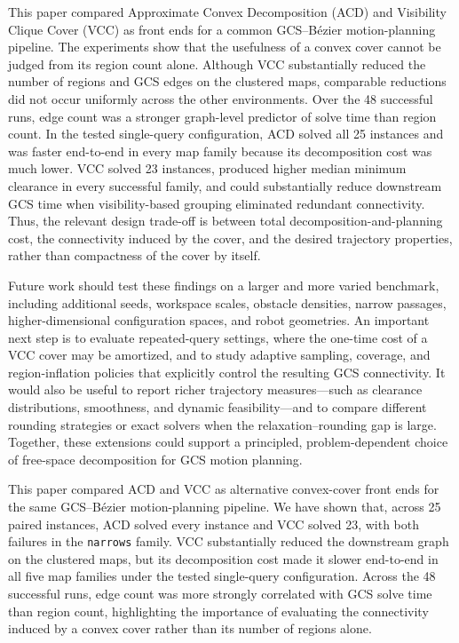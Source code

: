 ﻿\documentclass[runningheads]{llncs}
\newcommand{\code}[1]{\texttt{#1}}
\begin{document}
This paper compared Approximate Convex Decomposition (ACD) and Visibility
Clique Cover (VCC) as front ends for a common GCS--B\'ezier motion-planning
pipeline.  The experiments show that the usefulness of a convex cover cannot
be judged from its region count alone.  Although VCC substantially reduced the
number of regions and GCS edges on the {clustered} maps, comparable
reductions did not occur uniformly across the other environments.  Over the 48
successful runs, edge count was a stronger graph-level predictor of solve time
than region count.  In the tested single-query configuration, ACD solved all
25 instances and was faster end-to-end in every map family because its
decomposition cost was much lower.  VCC solved 23 instances, produced higher
median minimum clearance in every successful family, and could substantially
reduce downstream GCS time when visibility-based grouping eliminated redundant
connectivity.  Thus, the relevant design trade-off is between total
decomposition-and-planning cost, the connectivity induced by the cover, and
the desired trajectory properties, rather than compactness of the cover by
itself.

Future work should test these findings on a larger and more varied benchmark,
including additional seeds, workspace scales, obstacle densities, narrow
passages, higher-dimensional configuration spaces, and robot geometries.
An important next step is to evaluate repeated-query settings, where the
one-time cost of a VCC cover may be amortized, and to study adaptive sampling,
coverage, and region-inflation policies that explicitly control the resulting
GCS connectivity.  It would also be useful to report richer trajectory
measures---such as clearance distributions, smoothness, and dynamic
feasibility---and to compare different rounding strategies or exact solvers
when the relaxation--rounding gap is large.  Together, these extensions could
support a principled, problem-dependent choice of free-space decomposition for
GCS motion planning.

This paper compared ACD and VCC as alternative convex-cover front ends for the
same GCS--B\'ezier motion-planning pipeline. We have shown that, across 25 paired
instances, ACD solved every instance and VCC solved 23, with both failures in the
\code{narrows} family. VCC substantially reduced the downstream graph on the
{clustered} maps, but its decomposition cost made it slower end-to-end in
all five map families under the tested single-query configuration. Across the
48 successful runs, edge count was more strongly correlated with GCS solve time
than region count, highlighting the importance of evaluating the connectivity
induced by a convex cover rather than its number of regions alone.
\end{document}
